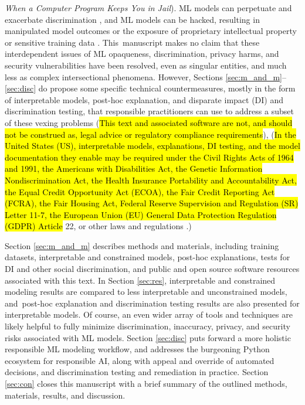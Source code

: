 \documentclass[information,article,accept,moreauthors,pdftex]{Definitions/mdpi}
\begin{document}
{{{\textit{When a Computer Program Keeps You in Jail}}). ML models can perpetuate and exacerbate discrimination \cite{feldman2015certifying,dwork2012fairness,gender_shades}, and ML models can be hacked, resulting in manipulated model outcomes or the exposure of proprietary intellectual property or sensitive training data \cite{security_of_ml,model_stealing,membership_inference,shokri2019privacy}. This~manuscript makes no claim that these interdependent issues of ML opaqueness, discrimination, privacy harms, and security vulnerabilities have been resolved, even as singular entities, and much less as complex intersectional phenomena. However, Sections \ref{sec:m_and_m}--\ref{sec:disc} do propose some specific technical countermeasures, mostly in the form of interpretable models, post-hoc explanation, and disparate impact (DI) and discrimination testing, that responsible practitioners can use to address a subset of these vexing problems ({\hl{This text and associated software are not, and should not be construed as, legal advice or regulatory compliance requirements}}), ({\hl{In the United States (US), interpretable models, explanations, DI testing, and the model documentation they enable may be required under the Civil Rights Acts of 1964 and 1991, the Americans with Disabilities Act, the Genetic Information Nondiscrimination Act, the Health Insurance Portability and Accountability Act, the Equal Credit Opportunity Act (ECOA), the Fair Credit Reporting Act (FCRA), the Fair Housing Act, Federal Reserve Supervision and Regulation (SR) Letter 11-7, the European Union (EU) General Data Protection Regulation (GDPR) Article} 22, or other laws and regulations \cite{ff_interpretability}.})%

Section \ref{sec:m_and_m} describes methods and materials, including training datasets, interpretable and constrained models, post-hoc explanations, tests for DI and other social discrimination, and public and open source software resources associated with this text. In Section \ref{sec:res}, interpretable and constrained modeling results are compared to less interpretable and unconstrained models, and~post-hoc explanation and discrimination testing results are also presented for interpretable models. Of course, an even wider array of tools and techniques are likely helpful to fully minimize discrimination, inaccuracy, privacy, and security risks associated with ML models. Section \ref{sec:disc} puts forward a more holistic responsible ML modeling workflow, and addresses the burgeoning Python ecosystem for responsible AI, along with appeal and override of automated decisions, and discrimination testing and remediation in practice. Section \ref{sec:con} closes this manuscript with a brief summary of the outlined methods, materials, results, and discussion.

}}
\end{document}
